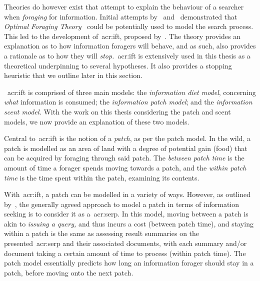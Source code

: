 Theories do however exist that attempt to explain the behaviour of a searcher when \emph{foraging} for information. Initial attempts by~\cite{russell1993sense_making} and~\cite{sandstrom1994optimal_foraging} demonstrated that \emph{Optimal Foraging Theory}~\citep{stephens1986foraging_theory} could be potentially used to model the search process. This led to the development of~\gls{acr:ift}, proposed by~\cite{pirolli1999ift}. The theory provides an explanation as to how information foragers will behave, and as such, also provides a rationale as to how they will \emph{stop.}~\gls{acr:ift} is extensively used in this thesis as a theoretical underpinning to several hypotheses. It also provides a stopping heuristic that we outline later in this section.

\noindent
{}~\gls{acr:ift} is comprised of three main models: the \emph{information diet model}, concerning \emph{what} information is consumed; the \emph{information patch model}; and the \emph{information scent model.} With the work on this thesis considering the patch and scent models, we now provide an explanation of these two models.

Central to~\gls{acr:ift} is the notion of a \emph{patch}, as per the patch model. In the wild, a patch is modelled as an area of land with a degree of potential gain (food) that can be acquired by foraging through said patch. The \emph{between patch time} is the amount of time a forager spends moving towards a patch, and the \emph{within patch time} is the time spent within the patch, examining its contents.

With~\gls{acr:ift}, a patch can be modelled in a variety of ways. However, as outlined by~\cite{azzopardi2015theories}, the generally agreed approach to model a patch in terms of information seeking is to consider it as a~\gls{acr:serp}. In this model, moving between a patch is akin to \emph{issuing a query,} and thus incurs a cost (between patch time), and staying within a patch is the same as assessing result summaries on the presented~\gls{acr:serp} and their associated documents, with each summary and/or document taking a certain amount of time to process (within patch time). The patch model essentially predicts how long an information forager should stay in a patch, before moving onto the next patch.

